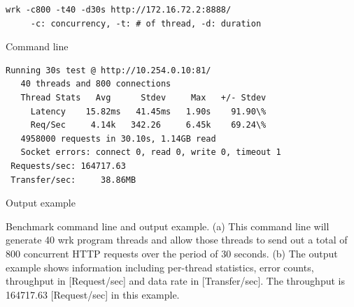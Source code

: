 \begin{table}[h]

  \begin{subtable}{1\textwidth}

    \centering
    \begin{minipage}{0.9\columnwidth}
      \begin{lstlisting}[frame=lines,breaklines=true,basicstyle=\small\ttfamily]
 wrk -c800 -t40 -d30s http://172.16.72.2:8888/
     -c: concurrency, -t: # of thread, -d: duration
      \end{lstlisting}
    \end{minipage}

    \centering\caption{Command line}
  \end{subtable}
 
\par\bigskip
 
  \begin{subtable}{1\textwidth}
    \centering
    \begin{minipage}{0.9\columnwidth}
      \begin{lstlisting}[frame=lines,breaklines=true,basicstyle=\small\ttfamily]
 Running 30s test @ http://10.254.0.10:81/
   40 threads and 800 connections
   Thread Stats   Avg      Stdev     Max   +/- Stdev
     Latency    15.82ms   41.45ms   1.90s    91.90\%
     Req/Sec     4.14k   342.26     6.45k    69.24\%
   4958000 requests in 30.10s, 1.14GB read
   Socket errors: connect 0, read 0, write 0, timeout 1
 Requests/sec: 164717.63
 Transfer/sec:     38.86MB
      \end{lstlisting}
    \end{minipage}

    \centering\caption{Output example}
  \end{subtable}

  \par\bigskip
  \centering
  \begin{minipage}{0.9\columnwidth}
    \caption[Benchmark command line and output example]{
      Benchmark command line and output example.
      (a) This command line will generate 40 wrk program threads and allow those threads to send out a total of 800 concurrent HTTP requests over the period of 30 seconds.
      (b) The output example shows information including per-thread statistics, error counts, throughput in [Request/sec] and data rate in [Transfer/sec].
      The throughput is 164717.63 [Request/sec] in this example.
    }
    \label{tab:bench_example}
  \end{minipage}
\end{table}

